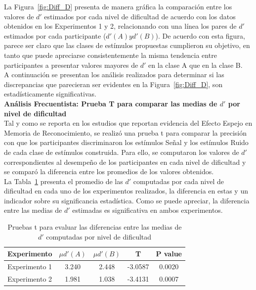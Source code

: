 La Figura~\ref{fig:Diff_D} presenta de manera gráfica la comparación entre los valores de $d'$ estimados por cada nivel de dificultad de acuerdo con los datos obtenidos en los Experimentos 1 y 2, relacionando con una línea los pares de $d'$ estimados por cada participante ($d'(A) y d'(B)$). De acuerdo con esta figura, parece ser claro que las clases de estímulos propuestas cumplieron su objetivo, en tanto que puede apreciarse consistentemente la misma tendencia entre participantes a presentar valores mayores de $d'$ en la clase A que en la clase B.\\

A continuación se presentan los análisis realizados para determinar si las discrepancias que parecieran ser evidentes en la Figura~\ref{fig:Diff_D}, son estadísticamente significativas.\\

\textbf{Análisis Frecuentista: Prueba T para comparar las medias de $d'$ por nivel de dificultad}\\

Tal y como se reporta en los estudios que reportan evidencia del Efecto Espejo en Memoria de Reconocimiento, se realizó una prueba t para comparar la precisión con que los participantes discriminaron los estímulos Señal y los estímulos Ruido de cada clase de estímulos construida. Para ello, se computaron los valores de $d'$ correspondientes al desempeño de los participantes en cada nivel de dificultad y se comparó la diferencia entre los promedios de los valores obtenidos.\\

La Tabla~\ref{Tabla_t-Dprimas} presenta el promedio de las $d'$ computadas por cada nivel de dificultad en cada uno de los experimentos realizados, la diferencia en estas y un indicador sobre su significancia estadística. Como se puede apreciar, la diferencia entre las medias de $d'$ estimadas es significativa en ambos experimentos.\\

\begin{table}
\caption[Prueba T para evaluar las diferencias entre las medias de $d'$ por nivel de dificultad]{Pruebas t para evaluar las diferencias entre las medias de $d'$ computadas por nivel de dificultad}
\label{Tabla_t-Dprimas}
\centering
\begin{tabular}{l | c c c c}
\toprule
\textbf{Experimento} & \textbf{$\mu d'(A)$} & \textbf{$\mu d'(B)$} & \textbf{T}  & \textbf{P value}\\
\midrule
Experimento 1 & 3.240 & 2.448 & -3.0587 & 0.0020 \\
Experimento 2 & 1.981 & 1.038 & -3.4131 & 0.0007 \\
\bottomrule
\end{tabular}
\end{table}


